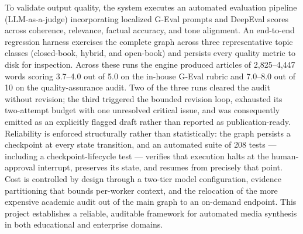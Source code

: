 To validate output quality, the system executes an automated evaluation pipeline (LLM-as-a-judge) incorporating localized G-Eval prompts and DeepEval scores across coherence, relevance, factual accuracy, and tone alignment. An end-to-end regression harness exercises the complete graph across three representative topic classes (closed-book, hybrid, and open-book) and persists every quality metric to disk for inspection. Across these runs the engine produced articles of 2,825--4,447 words scoring 3.7--4.0 out of 5.0 on the in-house G-Eval rubric and 7.0--8.0 out of 10 on the quality-assurance audit. Two of the three runs cleared the audit without revision; the third triggered the bounded revision loop, exhausted its two-attempt budget with one unresolved critical issue, and was consequently emitted as an explicitly flagged draft rather than reported as publication-ready. Reliability is enforced structurally rather than statistically: the graph persists a checkpoint at every state transition, and an automated suite of 208 tests --- including a checkpoint-lifecycle test --- verifies that execution halts at the human-approval interrupt, preserves its state, and resumes from precisely that point. Cost is controlled by design through a two-tier model configuration, evidence partitioning that bounds per-worker context, and the relocation of the more expensive academic audit out of the main graph to an on-demand endpoint. This project establishes a reliable, auditable framework for automated media synthesis in both educational and enterprise domains.
